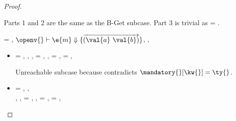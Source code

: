 \begin{lemma}
\begin{proof}
\begin{case}[B-Get]
\begin{itemize}
\begin{subcase}[T-GetHMapPartialDefault]
         Parts 1 and 2 are the same as the B-Get subcase.
         Part 3 is trivial as \ty{} = \Top.
      \end{subcase}
  \end{itemize}
\end{case}

\begin{case}[B-GetMissing]
        \val{} = \nil,
        $\opsem {\openv{}}
        {\e{m}} {\curlymap{\overrightarrow{({\val{a}}\ {\val{b}})}}}$,
       \opsem {\openv{}} {} {\kw{}},

  \begin{itemize}
    \item[]
      \begin{subcase}[T-GetHMap]
  \ep{} = { {}},
  \judgementrewrite {\propenv{}} {} {\Unionsplice {\overrightarrow {\HMapgeneric {\mandatory{}} {\absent{}}}}}
           { {}}
           {}
           {},
  \judgementtworewrite {\propenv{}} {} {}{},
  \e{} = { {}},
  ,
  \thenprop{\prop{}} = {\topprop{}},
  \elseprop{\prop{}} = {\topprop{}},

       Unreachable subcase because 
       contradicts ${\inmandatory{\kw{}}{\ty{}}{\mandatory{}}}$.
      \end{subcase}
    \item[]
      \begin{subcase}[T-GetHMapAbsent]
  \ep{} = { {}},
  \judgementtworewrite {\propenv{}} {} {} {},
  \\
  \judgementrewrite {\propenv{}} {} {\HMapgeneric {\mandatory{}} {\absent}}
           { {}}
           {}
           {},
  {\inabsent{\kw{}}{\absent{}}},
  \e{} = { {}},
  \issubtypein{}{\Nil}{\ty{}},
  \thenprop{\prop{}} = {\topprop{}},
  \elseprop{\prop{}} = {\topprop{}},


\end{subcase}
\end{itemize}
\end{case}
\end{proof}
\end{lemma}
